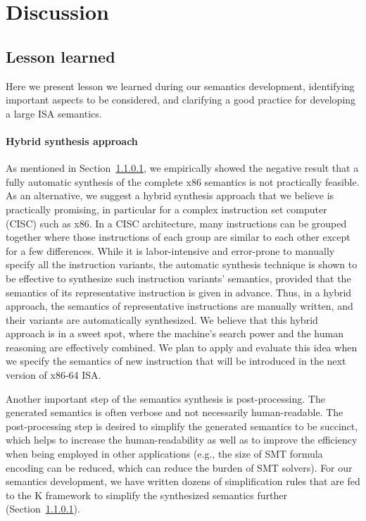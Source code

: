 \section{Discussion}

\subsection{Lesson learned}
\label{sec:lesson-learned}

Here we present lesson we learned during our semantics development, identifying important aspects to be considered, and clarifying a good practice for developing a large ISA semantics.

\paragraph{Hybrid synthesis approach}

As mentioned in Section~\ref{}, we empirically showed the negative result that a fully automatic synthesis of the complete x86 semantics is not practically feasible. As an alternative, we suggest a hybrid synthesis approach that we believe is practically promising, in particular for a complex instruction set computer (CISC) such as x86. In a CISC architecture, many instructions can be grouped together where those instructions of each group are similar to each other except for a few differences. While it is labor-intensive and error-prone to manually specify all the instruction variants, the automatic synthesis technique is shown to be effective to synthesize such instruction variants' semantics, provided that the semantics of its representative instruction is given in advance. Thus, in a hybrid approach, the semantics of representative instructions are manually written, and their variants are automatically synthesized. We believe that this hybrid approach is in a sweet spot, where the machine's search power and the human reasoning are effectively combined. We plan to apply and evaluate this idea when we specify the semantics of new instruction that will be introduced in the next version of x86-64 ISA.

Another important step of the semantics synthesis is post-processing. The generated semantics is often verbose and not necessarily human-readable. The post-processing step is desired to simplify the generated semantics to be succinct, which helps to increase the human-readability as well as to improve the efficiency when being employed in other applications (e.g., the size of SMT formula encoding can be reduced, which can reduce the burden of SMT solvers). For our semantics development, we have written dozens of simplification rules that are fed to the K framework to simplify the synthesized semantics further (Section~\ref{}).

